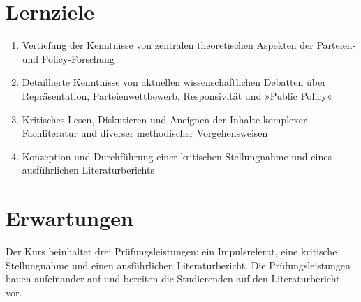 \documentclass[abstract=on,parskip=full,headings=standardclasses,fontsize=11pt,paper=a4]{scrartcl}
\begin{document}
\section*{Lernziele}

\begin{enumerate}
\item Vertiefung der Kenntnisse von zentralen theoretischen Aspekten der Parteien- und Policy-Forschung
\item Detaillierte Kenntnisse von aktuellen wissenschaftlichen Debatten über Repräsentation, Parteienwettbewerb, Responsivität und »Public Policy«
\item  Kritisches Lesen, Diskutieren und Aneignen der Inhalte komplexer Fachliteratur und diverser methodischer Vorgehensweisen
\item Konzeption und Durchführung einer kritischen Stellungnahme und eines ausführlichen Literaturberichts
\end{enumerate}

\section*{Erwartungen}

Der Kurs beinhaltet drei Prüfungsleistungen: ein Impulsreferat, eine kritische Stellungnahme und einen ausführlichen Literaturbericht. Die  Prüfungsleistungen bauen aufeinander auf und bereiten die Studierenden auf den Literaturbericht vor. 
\end{document}
